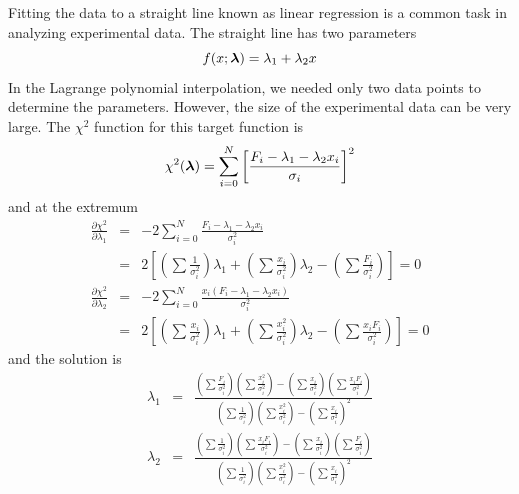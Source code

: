 Fitting the data to a straight line known as linear regression is a common task in analyzing experimental data. The straight line has two parameters
\begin{equation}
f(x;\boldsymbol{\lambda}) = \lambda_1 + \lambda_2 x
\end{equation}
In the Lagrange polynomial interpolation, we needed only two data points to determine the parameters.  However, the size of the experimental data can be very large.  
The $\chi^2$ function for this target function is
\begin{equation}
\chi^2(\boldsymbol{\lambda}) = \sum_{i=0}^{N} \left [\frac{F_i - \lambda_1 - \lambda_2 x_i}{\sigma_i} \right ]^2
\end{equation}
and at the extremum
\begin{subequations}
\begin{eqnarray}
\frac{\partial \chi^2}{\partial \lambda_1} &=& - 2  \sum_{i=0}^{N} \frac{F_i - \lambda_1 - \lambda_2 x_i}{\sigma_i^2} \nonumber\\
&=& 2 \left [ \left ( \sum \frac{1}{\sigma_i^2}\right ) \lambda_1 + \left ( \sum \frac{x_i}{\sigma_i^2}\right ) \lambda_2 - \left ( \sum \frac{F_i}{\sigma_i^2}\right ) \right ] = 0\\
\frac{\partial \chi^2}{\partial \lambda_2} &=& - 2  \sum_{i=0}^{N} \frac{x_i (F_i - \lambda_1 - \lambda_2 x_i)}{\sigma_i^2}\nonumber \\
&=& 2 \left [ \left ( \sum \frac{x_i}{\sigma_i^2}\right ) \lambda_1 + \left ( \sum \frac{x_i^2}{\sigma_i^2}\right ) \lambda_2 - \left ( \sum \frac{x_i F_i}{\sigma_i^2}\right ) \right ] = 0
\end{eqnarray}
\end{subequations}
and the solution is
\begin{subequations}\label{eq:linear_regression}
\begin{eqnarray}
\lambda_1 &=& \frac{ \left ( \sum \frac{F_i}{\sigma_i^2}\right ) \left ( \sum \frac{x_i^2}{\sigma_i^2}\right ) -
\left ( \sum \frac{x_i}{\sigma_i^2}\right ) \left ( \sum \frac{x_i F_i}{\sigma_i^2}\right )}
{ \left ( \sum \frac{1}{\sigma_i^2}\right )  \left ( \sum \frac{x_i^2}{\sigma_i^2}\right ) - \left ( \sum \frac{x_i}{\sigma_i^2}\right )^2}\\
\lambda_2 &=& \frac{\left ( \sum \frac{1}{\sigma_i^2}\right )  \left ( \sum \frac{x_i F_i}{\sigma_i^2}\right )-
 \left ( \sum \frac{x_i}{\sigma_i^2}\right ) \left ( \sum \frac{F_i}{\sigma_i^2}\right ) }
 {\left ( \sum \frac{1}{\sigma_i^2}\right )  \left ( \sum \frac{x_i^2}{\sigma_i^2}\right ) - \left ( \sum \frac{x_i}{\sigma_i^2}\right )^2}
\end{eqnarray}
\end{subequations}

